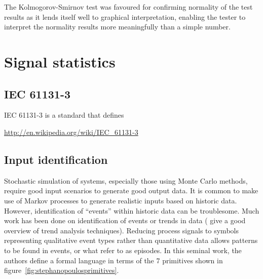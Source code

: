 The Kolmogorov-Smirnov test was favoured for confirming normality of
the test results as it lends itself well to graphical interpretation,
enabling the tester to interpret the normality results more
meaningfully than a simple number.

\section{Signal statistics}


\subsection{IEC 61131-3}
IEC 61131-3 is a standard that defines

\url{http://en.wikipedia.org/wiki/IEC_61131-3}

\subsection{Input identification}
Stochastic simulation of systems, especially those using Monte Carlo
methods, require good input scenarios to generate good output data.
It is common to make use of Markov processes to generate realistic
inputs based on historic data.  However, identification of ``events''
within historic data can be troublesome.  Much work has been done on
identification of events or trends in data (\citet{maurya.rengaswamy.ea2007fault}
give a good overview of trend analysis techniques).  Reducing process
signals to symbols representing qualitative event types rather than
quantitative data allows patterns to be found in events, or what
\citet{cheung.stephanopoulos1990representation} refer to as
episodes.  In this seminal work, the authors define a formal language
in terms of the 7 primitives shown in
figure~\ref{fig:stephanopoulosprimitives}.

